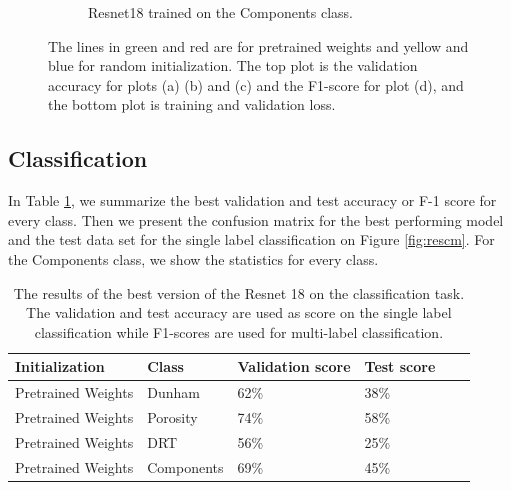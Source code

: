 \begin{figure}
\begin{subfigure}{.6\textwidth}
  \caption{Resnet18 trained on the Components class.}
  \label{fig:resinit_compo}
\end{subfigure}
\caption[Training and validation plots for Resnet 18]{The lines in green and red are for pretrained weights and yellow and blue for random initialization. The top plot is the validation accuracy for plots (a) (b) and (c) and the F1-score for plot (d), and the bottom plot is training  and validation loss.}
\label{fig:plotsres}
\end{figure}
\subsection{Classification}
In Table \ref{tab:resbest}, we summarize the best validation and test accuracy or F-1 score for every class. Then we present the confusion matrix for the best performing model and the test data set for the single label classification on Figure \ref{fig:rescm}. For the Components class, we show the statistics for every class. 

\begin{table}
\caption{\label{tab:resbest} The results of the best version of the Resnet 18 on the classification task. The validation and test accuracy are used as score on the single label classification while F1-scores are used for multi-label classification.}
\centering
\begin{tabular}[b]{| l | l | l | l | l |}
\hline
    Initialization & Class & Validation score & Test score \ \\ \hline
    Pretrained Weights & Dunham &  62\%  & 38\% \\ \hline
    Pretrained Weights & Porosity & 74\%  &  58\% \\ \hline
    Pretrained Weights &DRT & 56\% &  25\% \\ \hline
    Pretrained Weights &Components & 69\% &  45\% \\ \hline
\end{tabular} 
\end{table}

